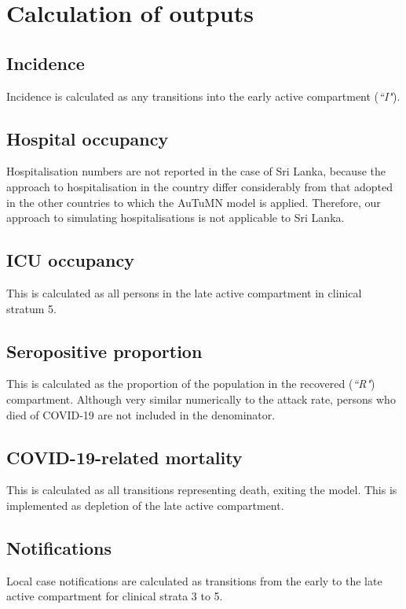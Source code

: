 \section{Calculation of outputs}

\subsection{Incidence}
Incidence is calculated as any transitions into the early active compartment (\textit{``I"}).

\subsection{Hospital occupancy}
Hospitalisation numbers are not reported in the case of Sri Lanka, because the approach to hospitalisation in the country differ considerably from that adopted in the other countries to which the AuTuMN model is applied. Therefore, our approach to simulating hospitalisations is not applicable to Sri Lanka.

\subsection{ICU occupancy}
This is calculated as all persons in the late active compartment in clinical stratum 5.

\subsection{Seropositive proportion}
This is calculated as the proportion of the population in the recovered (\textit{``R"}) compartment. Although very similar numerically to the attack rate, persons who died of COVID-19 are not included in the denominator.

\subsection{COVID-19-related mortality}
This is calculated as all transitions representing death, exiting the model. This is implemented as depletion of the late active compartment.

\subsection{Notifications}
Local case notifications are calculated as transitions from the early to the late active compartment for clinical strata 3 to 5.



